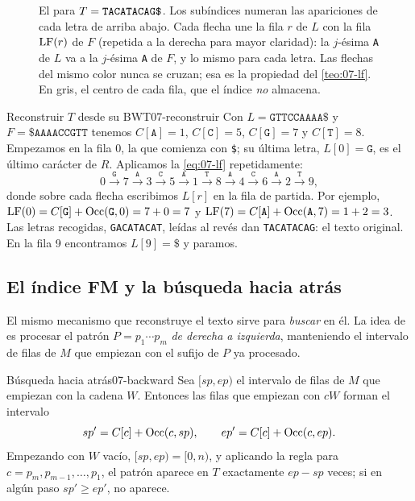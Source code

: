 \begin{figure}[tbp]
\centering

\caption[El ]{El  para $T=\texttt{TACATACAG\$}$. Los subíndices numeran las apariciones de cada letra de arriba abajo. Cada flecha une la fila $r$ de $L$ con la fila $\operatorname{LF}(r)$ de $F$ (repetida a la derecha para mayor claridad): la $j$-ésima \texttt{A} de $L$ va a la $j$-ésima \texttt{A} de $F$, y lo mismo para cada letra. Las flechas del mismo color nunca se cruzan; esa es la propiedad del \cref{teo:07-lf}. En gris, el centro de cada fila, que el índice \emph{no} almacena.}
\label{fig:07-lf}
\end{figure}

\begin{ejemplo}{Reconstruir $T$ desde su BWT}{07-reconstruir}
Con $L=\texttt{GTTCCAAAA\$}$ y $F=\texttt{\$AAAACCGTT}$ tenemos $C[\texttt{A}]=1$, $C[\texttt{C}]=5$, $C[\texttt{G}]=7$ y $C[\texttt{T}]=8$. Empezamos en la fila $0$, la que comienza con \texttt{\$}; su última letra, $L[0]=\texttt{G}$, es el último carácter de $R$. Aplicamos la \cref{eq:07-lf} repetidamente:
\[
0 \xrightarrow{\texttt{G}} 7 \xrightarrow{\texttt{A}} 3 \xrightarrow{\texttt{C}} 5 \xrightarrow{\texttt{A}} 1 \xrightarrow{\texttt{T}} 8 \xrightarrow{\texttt{A}} 4 \xrightarrow{\texttt{C}} 6 \xrightarrow{\texttt{A}} 2 \xrightarrow{\texttt{T}} 9,
\]
donde sobre cada flecha escribimos $L[r]$ en la fila de partida. Por ejemplo, $\operatorname{LF}(0)=C[\texttt{G}]+\operatorname{Occ}(\texttt{G},0)=7+0=7$ y $\operatorname{LF}(7)=C[\texttt{A}]+\operatorname{Occ}(\texttt{A},7)=1+2=3$. Las letras recogidas, \texttt{GACATACAT}, leídas al revés dan \texttt{TACATACAG}: el texto original. En la fila 9 encontramos $L[9]=\texttt{\$}$ y paramos.
\end{ejemplo}

\subsection{El índice FM y la búsqueda hacia atrás}

El mismo mecanismo que reconstruye el texto sirve para \emph{buscar} en él. La idea de \textcite{c07-ferragina2005} es procesar el patrón $P=p_1\cdots p_m$ \emph{de derecha a izquierda}, manteniendo el intervalo de filas de $M$ que empiezan con el sufijo de $P$ ya procesado.

\begin{teorema}{Búsqueda hacia atrás}{07-backward}
Sea $[sp, ep)$ el intervalo de filas de $M$ que empiezan con la cadena $W$. Entonces las filas que empiezan con $cW$ forman el intervalo
\begin{equation}\label{eq:07-backward}
sp' = C[c] + \operatorname{Occ}(c, sp), \qquad ep' = C[c] + \operatorname{Occ}(c, ep).
\end{equation}
Empezando con $W$ vacío, $[sp,ep)=[0,n)$, y aplicando la regla para $c=p_m, p_{m-1},\dots,p_1$, el patrón aparece en $T$ exactamente $ep-sp$ veces; si en algún paso $sp'\ge ep'$, no aparece.
\end{teorema}

